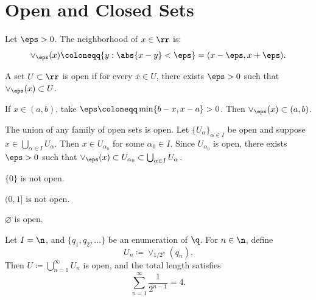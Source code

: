 
\section{Open and Closed Sets}


\begin{definition}
    Let $\eps > 0$.
    The neighborhood of $x\in\rr$ is:
    \[
        \vee_{\eps}(x)\coloneqq \{y : \abs{x-y} < \eps\} = (x-\eps,x+\eps).
    \]
\end{definition}

\begin{definition}
    A set $U\subset\rr$ is open if for every $x\in U$, there exists $\eps > 0$ such that $\vee_{\eps}(x)\subset U$.
\end{definition}

\begin{example}
    If $x\in(a,b)$, take $\eps \coloneqq\min\{b-x, x-a\} > 0$.
    Then $\vee_{\eps}(x) \subset (a,b)$.
\end{example}

\begin{theorem}{
    The union of any family of open sets is open.
}
                 Let $\{U_\alpha\}_{\alpha\in I}$ be open and suppose $x\in\bigcup_{\alpha\in I} U_\alpha$.
                 Then $x\in U_{\alpha_0}$ for some $\alpha_0\in I$.
                 Since $U_{\alpha_0}$ is open, there exists $\eps > 0$ such that $\vee_{\eps}(x)\subset U_{\alpha_0}\subset\bigcup_{\alpha\in I} U_\alpha$.
\end{theorem}

\begin{example}
    $\{0\}$ is not open.

    $(0,1]$ is not open.

    $\varnothing$ is open.
\end{example}

\begin{example}
    Let $I = \n$, and $\{q_1,q_2,\ldots\}$ be an enumeration of $\q$.
    For $n\in\n$, define
    \[
        U_n\coloneqq\vee_{1/2^n}(q_n).
    \]
    Then $U\coloneqq \bigcup_{n=1}^\infty U_n$ is open, and the total length satisfies
    \[
        \sum_{n=1}^\infty \frac{1}{2^{n-1}} = 4.
    \]
\end{example}

